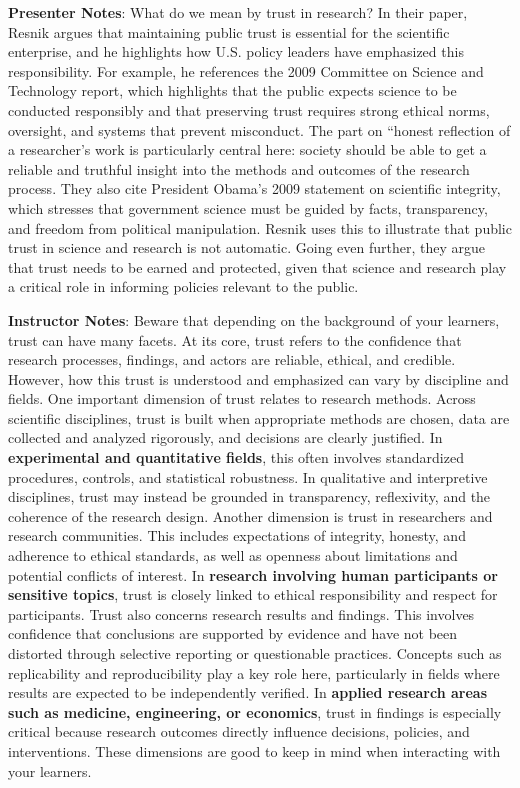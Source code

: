 \documentclass[
  letterpaper,
  DIV=11,
  numbers=noendperiod]{scrartcl}
\begin{document}
\textbf{Presenter Notes}: What do we mean by trust in research? In their
paper, Resnik argues that maintaining public trust is essential for the
scientific enterprise, and he highlights how U.S. policy leaders have
emphasized this responsibility. For example, he references the 2009
Committee on Science and Technology report, which highlights that the
public expects science to be conducted responsibly and that preserving
trust requires strong ethical norms, oversight, and systems that prevent
misconduct. The part on ``honest reflection of a researcher's work is
particularly central here: society should be able to get a reliable and
truthful insight into the methods and outcomes of the research process.
They also cite President Obama's 2009 statement on scientific integrity,
which stresses that government science must be guided by facts,
transparency, and freedom from political manipulation. Resnik uses this
to illustrate that public trust in science and research is not
automatic. Going even further, they argue that trust needs to be earned
and protected, given that science and research play a critical role in
informing policies relevant to the public.

\textbf{Instructor Notes}: Beware that depending on the background of
your learners, trust can have many facets. At its core, trust refers to
the confidence that research processes, findings, and actors are
reliable, ethical, and credible. However, how this trust is understood
and emphasized can vary by discipline and fields. One important
dimension of trust relates to research methods. Across scientific
disciplines, trust is built when appropriate methods are chosen, data
are collected and analyzed rigorously, and decisions are clearly
justified. In \textbf{experimental and quantitative fields}, this often
involves standardized procedures, controls, and statistical robustness.
In qualitative and interpretive disciplines, trust may instead be
grounded in transparency, reflexivity, and the coherence of the research
design. Another dimension is trust in researchers and research
communities. This includes expectations of integrity, honesty, and
adherence to ethical standards, as well as openness about limitations
and potential conflicts of interest. In \textbf{research involving human
participants or sensitive topics}, trust is closely linked to ethical
responsibility and respect for participants. Trust also concerns
research results and findings. This involves confidence that conclusions
are supported by evidence and have not been distorted through selective
reporting or questionable practices. Concepts such as replicability and
reproducibility play a key role here, particularly in fields where
results are expected to be independently verified. In \textbf{applied
research areas such as medicine, engineering, or economics}, trust in
findings is especially critical because research outcomes directly
influence decisions, policies, and interventions. These dimensions are
good to keep in mind when interacting with your learners.
\end{document}
